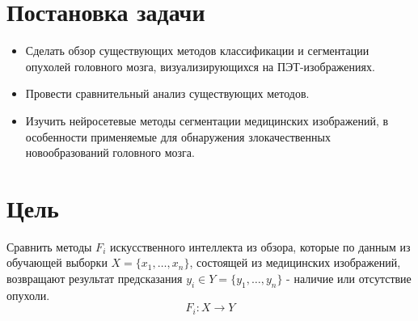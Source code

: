 \section{Постановка задачи}
\begin{itemize}
    \item Сделать обзор существующих методов классификации и сегментации опухолей головного мозга,
    визуализирующихся на ПЭТ-изображениях.
    \item Провести сравнительный анализ существующих методов.
    \item Изучить нейросетевые методы сегментации медицинских изображений, в особенности применяемые для обнаружения злокачественных новообразований головного мозга.
\end{itemize}

\newpage

\section{Цель}
Сравнить методы \(F_i\) искусственного интеллекта из обзора, которые по 
    данным из обучающей выборки \(X=\{x_1,\dots,x_n\}\),
    состоящей из медицинских изображений, возвращают результат предсказания \(y_i \in Y = \{y_1, \dots, y_n\} \) - наличие или отсутствие опухоли.
\[F_i: X \rightarrow Y\]


